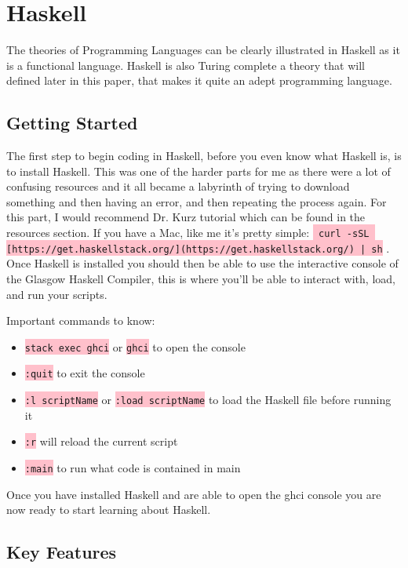 \documentclass{article}
\begin{document}
\section{Haskell}\label{haskell}

The theories of Programming Languages can be clearly illustrated in Haskell as it is a functional language. Haskell is also Turing complete a theory that will defined later in this paper, that makes it quite an adept programming language.

\subsection{Getting Started}

The first step to begin coding in Haskell, before you even know what Haskell is, is to install Haskell. This was one of the harder parts for me as there were a lot of confusing resources and it all became a labyrinth of trying to download something and then having an error, and then repeating the process again. For this part, I would recommend Dr. Kurz tutorial which can be found in the resources section.  If you have a Mac, like me it's pretty simple:   \colorbox{pink}{ \lstinline{ curl -sSL [https://get.haskellstack.org/](https://get.haskellstack.org/) | sh}} . 
Once Haskell is installed you should then be able to use the interactive console of the Glasgow Haskell Compiler, this is where you'll be able to interact with, load, and run your scripts. 

Important commands to know:
\begin{itemize}
\item \colorbox{pink}{ \lstinline{stack exec ghci}} or \colorbox{pink}{ \lstinline{ghci}} to open the console
\item \colorbox{pink}{ \lstinline{:quit}} to exit the console
\item \colorbox{pink}{ \lstinline{:l scriptName}} or \colorbox{pink}{ \lstinline{:load scriptName}} to load the Haskell file before running it
\item \colorbox{pink}{ \lstinline{:r}} will reload the current script
\item \colorbox{pink}{ \lstinline{:main}} to run what code is contained in main
\end{itemize}

Once you have installed Haskell and are able to open the ghci console you are now ready to start learning about Haskell.

\subsection{Key Features}
\end{document}
